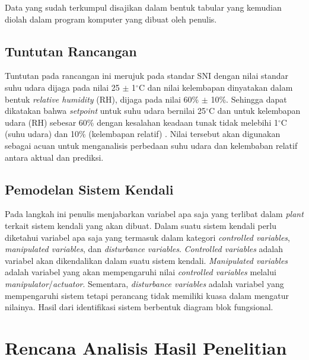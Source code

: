 Data yang sudah terkumpul disajikan dalam bentuk tabular yang kemudian diolah dalam program komputer yang dibuat oleh penulis.

\subsection{Tuntutan Rancangan}

Tuntutan pada rancangan ini merujuk pada standar SNI dengan nilai standar suhu udara dijaga pada nilai 25 $\pm$ 1$^{\circ}$C dan nilai kelembapan dinyatakan dalam bentuk \textit{relative humidity} (RH), dijaga pada nilai 60\% $\pm$ 10\%. Sehingga dapat dikatakan bahwa \textit{setpoint} untuk suhu udara bernilai 25$^{\circ}$C dan untuk kelembapan udara (RH) sebesar 60\% dengan kesalahan keadaan tunak tidak melebihi 1$^{\circ}$C (suhu udara) dan 10\% (kelembapan relatif) \cite{SNI-03-06390-2000}. Nilai tersebut akan digunakan sebagai acuan untuk menganalisis perbedaan suhu udara dan kelembaban relatif antara aktual dan prediksi.

\subsection{Pemodelan Sistem Kendali}
Pada langkah ini penulis menjabarkan variabel apa saja yang terlibat dalam \textit{plant} terkait sistem kendali yang akan dibuat. Dalam suatu sistem kendali perlu diketahui variabel apa saja yang termasuk dalam kategori \textit{controlled variables}, \textit{manipulated variables}, dan \textit{disturbance variables}. \textit{Controlled variables} adalah variabel akan dikendalikan dalam suatu sistem kendali. \textit{Manipulated variables} adalah variabel yang akan mempengaruhi nilai \textit{controlled variables} melalui \textit{manipulator}/\textit{actuator}. Sementara, \textit{disturbance variables} adalah variabel yang mempengaruhi sistem tetapi perancang tidak memiliki kuasa dalam mengatur nilainya. Hasil dari identifikasi sistem
berbentuk diagram blok fungsional.

\section{Rencana Analisis Hasil Penelitian}